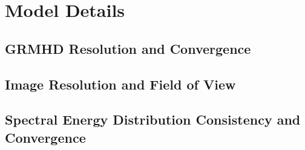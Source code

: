 \section{Model Details}\label{app:numerical}

\subsection{GRMHD Resolution and Convergence}\label{app:resolution_study}

\subsection{Image Resolution and Field of View}

\subsection{Spectral Energy Distribution Consistency and Convergence}

